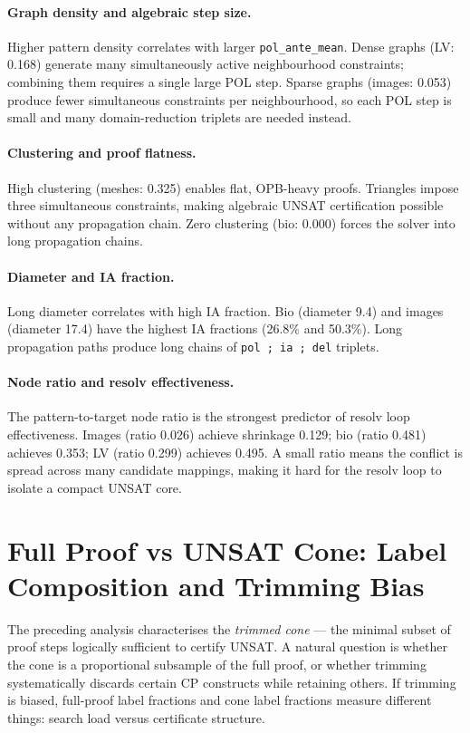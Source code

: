 \documentclass[11pt,a4paper]{article}
\begin{document}
\paragraph{Graph density and algebraic step size.}
Higher pattern density correlates with larger \texttt{pol\_ante\_mean}.
Dense graphs (LV: 0.168) generate many simultaneously active neighbourhood constraints;
combining them requires a single large POL step.
Sparse graphs (images: 0.053) produce fewer simultaneous constraints per neighbourhood, so
each POL step is small and many domain-reduction triplets are needed instead.

\paragraph{Clustering and proof flatness.}
High clustering (meshes: 0.325) enables flat, OPB-heavy proofs.
Triangles impose three simultaneous constraints, making algebraic UNSAT certification
possible without any propagation chain.
Zero clustering (bio: 0.000) forces the solver into long propagation chains.

\paragraph{Diameter and IA fraction.}
Long diameter correlates with high IA fraction.
Bio (diameter 9.4) and images (diameter 17.4) have the highest IA fractions (26.8\% and 50.3\%).
Long propagation paths produce long chains of \texttt{pol\,;\,ia\,;\,del} triplets.

\paragraph{Node ratio and resolv effectiveness.}
The pattern-to-target node ratio is the strongest predictor of resolv loop effectiveness.
Images (ratio 0.026) achieve shrinkage 0.129; bio (ratio 0.481) achieves 0.353;
LV (ratio 0.299) achieves 0.495.
A small ratio means the conflict is spread across many candidate mappings, making it
hard for the resolv loop to isolate a compact UNSAT core.

\section{Full Proof vs UNSAT Cone: Label Composition and Trimming Bias}
\label{sec:cone-vs-full}

The preceding analysis characterises the \emph{trimmed cone} — the minimal subset of proof steps
logically sufficient to certify UNSAT.
A natural question is whether the cone is a proportional subsample of the full proof, or whether
trimming systematically discards certain CP constructs while retaining others.
If trimming is biased, full-proof label fractions and cone label fractions measure different things:
search load versus certificate structure.
\end{document}
